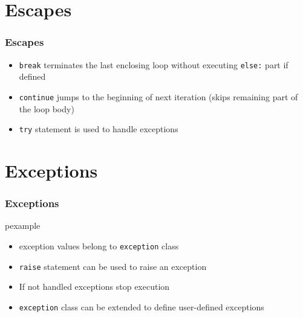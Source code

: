 \documentclass[trans,compress,xcolor=table]{beamer}
\begin{document}
\section{Escapes}
\begin{frame}
\frametitle{Escapes}
\begin{itemize}
\item \lstinline!break! terminates the last enclosing 
loop without executing \lstinline!else:! part if defined
\item \lstinline!continue! jumps to the beginning of next
   iteration (skips remaining part of the loop body)
\item \lstinline!try! statement is used to handle exceptions
\end{itemize}
\end{frame}


\section{Exceptions}
\begin{frame}
\frametitle{Exceptions}
\begin{beamercolorbox}{pexample}
\codetry
\end{beamercolorbox}

\begin{itemize}
\item exception values belong to \lstinline!exception! class
\item \lstinline!raise! statement can be used to raise an exception
\item If not handled exceptions stop execution
\item \lstinline!exception! class can be extended to define user-defined exceptions
\end{itemize}
\end{frame}
\end{document}
